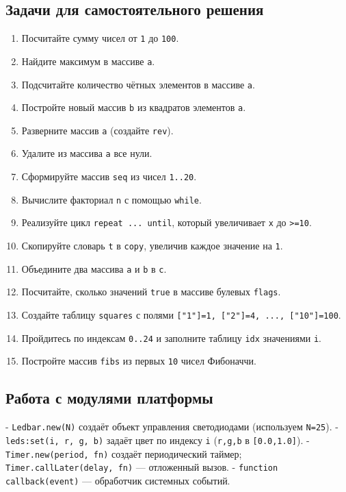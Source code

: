 \subsection*{Задачи для самостоятельного решения}
\begin{enumerate}
  \item Посчитайте сумму чисел от \verb|1| до \verb|100|.
  \item Найдите максимум в массиве \verb|a|.
  \item Подсчитайте количество чётных элементов в массиве \verb|a|.
  \item Постройте новый массив \verb|b| из квадратов элементов \verb|a|.
  \item Разверните массив \verb|a| (создайте \verb|rev|).
  \item Удалите из массива \verb|a| все нули.
  \item Сформируйте массив \verb|seq| из чисел \verb|1..20|.
  \item Вычислите факториал \verb|n| с помощью \verb|while|.
  \item Реализуйте цикл \verb|repeat ... until|, который увеличивает \verb|x| до \verb|>=10|.
  \item Скопируйте словарь \verb|t| в \verb|copy|, увеличив каждое значение на \verb|1|.
  \item Объедините два массива \verb|a| и \verb|b| в \verb|c|.
  \item Посчитайте, сколько значений \verb|true| в массиве булевых \verb|flags|.
  \item Создайте таблицу \verb|squares| с полями \verb|["1"]=1, ["2"]=4, ..., ["10"]=100|.
  \item Пройдитесь по индексам \verb|0..24| и заполните таблицу \verb|idx| значениями \verb|i|.
  \item Постройте массив \verb|fibs| из первых \verb|10| чисел Фибоначчи.
\end{enumerate}

\subsection{Работа с модулями платформы}
- \verb|Ledbar.new(N)| создаёт объект управления светодиодами (используем \verb|N=25|).
- \verb|leds:set(i, r, g, b)| задаёт цвет по индексу \verb|i| (\verb|r,g,b| в \verb|[0.0,1.0]|).
- \verb|Timer.new(period, fn)| создаёт периодический таймер; \verb|Timer.callLater(delay, fn)| — отложенный вызов.
- \verb|function callback(event)| — обработчик системных событий.

